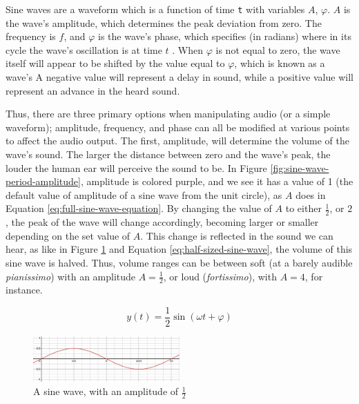 Sine waves are a waveform which is a function of time \texttt{t} with variables $A$, $\varphi$. $A$ is the wave's amplitude, which determines the peak deviation from zero. The frequency is $f$, and $\varphi$ is the wave's phase, which specifies (in radians) where in its cycle the wave's oscillation is at time $t$ \cite{Kirk_Hunt_2013}. When $\varphi$ is not equal to zero, the wave itself will appear to be shifted by the value equal to $\varphi$, which is known as a wave's  A negative value will represent a delay in sound, while a positive value will represent an advance in the heard sound.

Thus, there are three primary options when manipulating audio (or a simple waveform); amplitude, frequency, and phase can all be modified at various points to affect the audio output. The first, amplitude, will determine the volume of the wave's sound. The larger the distance between zero and the wave's peak, the louder the human ear will perceive the sound to be\cite{Zjalic_2021}. In Figure \ref{fig:sine-wave-period-amplitude}, amplitude is colored purple, and we see it has a value of 1 (the default value of amplitude of a sine wave from the unit circle), as $A$ does in Equation \ref{eq:full-sine-wave-equation}. By changing the value of $A$ to either $\frac{1}{2}$, or $2$, the peak of the wave will change accordingly, becoming larger or smaller depending on the set value of $A$. This change is reflected in the sound we can hear, as like in Figure \ref{fig:half-sized-sine-wave} and Equation \ref{eq:half-sized-sine-wave}, the volume of this sine wave is halved. Thus, volume ranges can be between soft (at a barely audible \textit{pianissimo}) with an amplitude $A = \frac{1}{2}$, or loud (\textit{fortissimo}), with $A = 4$, for instance.

\begin{equation}\label{eq:half-sized-sine-wave}
	y(t) = \frac{1}{2} \sin(\omega t + \varphi)
\end{equation}

\begin{figure}[ht]
	\centering
	\includegraphics[width=0.5\textwidth]{figures/half-sized-sine-wave.png}
	\caption{A sine wave, with an amplitude of $\frac{1}{2}$}
	\label{fig:half-sized-sine-wave}
\end{figure}

